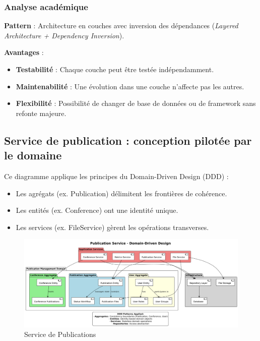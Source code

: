 \documentclass{rapportPfe}
\begin{document}
\subsubsection*{Analyse académique}

\textbf{Pattern} : Architecture en couches avec inversion des dépendances (\textit{Layered Architecture + Dependency Inversion}).

\textbf{Avantages} :
\begin{itemize}[label=+]
    \item \textbf{Testabilité} : Chaque couche peut être testée indépendamment.
    \item \textbf{Maintenabilité} : Une évolution dans une couche n’affecte pas les autres.
    \item \textbf{Flexibilité} : Possibilité de changer de base de données ou de framework sans refonte majeure.
\end{itemize}

\newpage
\FloatBarrier

\subsection{Service de publication : conception pilotée par le domaine}
Ce diagramme applique les principes du Domain-Driven Design (DDD) :

\begin{itemize}
    \item Les agrégats (ex. Publication) délimitent les frontières de cohérence.
    \item Les entités (ex. Conference) ont une identité unique.
    \item Les services (ex. FileService) gèrent les opérations transverses.
\end{itemize}

\begin{figure}[htbp]
    \centering
    \includegraphics[width=1.1\textwidth]{diagrams/diagram3.png}
    \caption{Service de Publications }
    \label{fig:diagram3}
\end{figure}
\end{document}
